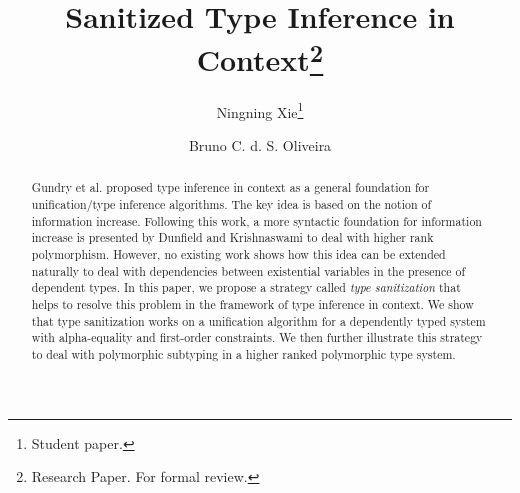\documentclass[oribibl]{llncs}
\begin{document}
\title{Sanitized Type Inference in Context\thanks{Research Paper. For formal review.}}

\author{Ningning Xie\thanks{Student paper.} \and Bruno C. d. S. Oliveira}

\maketitle

\begin{abstract}
  Gundry et al. proposed type inference in context as a general foundation for
  unification/type inference algorithms. The key idea is based on the notion of
  information increase. Following this work, a more syntactic foundation for
  information increase is presented by Dunfield and Krishnaswami to deal with higher rank polymorphism.
  However, no existing work shows how this idea can be extended naturally to deal
  with dependencies between existential variables in the presence of dependent types.
  In this paper, we propose a strategy called \textit{type
    sanitization} that helps to resolve this problem
  in the framework of type inference in context. We show
  that type sanitization works on a unification algorithm for a dependently typed
  system with alpha-equality and first-order constraints. We then further illustrate
  this strategy to deal with polymorphic subtyping in a higher ranked
  polymorphic type system.
\end{abstract}




\setlength{\belowcaptionskip}{-1pt}








% 



\appendix



\end{document}
